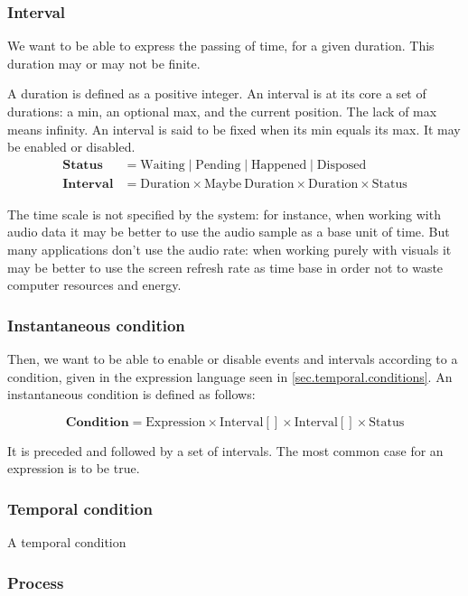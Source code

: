 \documentclass[applsci,article,submit,moreauthors,pdftex,10pt,a4paper]{mdpi}
\begin{document}
\subsubsection{Interval}
We want to be able to express the passing of time, for a given duration.
This duration may or may not be finite.

A duration is defined as a positive integer.
An interval is at its core a set of durations: a min, an optional max, and the current position. 
The lack of max means infinity.
An interval is said to be fixed when its min equals its max. It may be enabled or disabled.
\begin{align*}
\mathbf{Status} &= \mathrm{Waiting} \mid \mathrm{Pending} \mid \mathrm{Happened} \mid \mathrm{Disposed} \\
\mathbf{Interval} &= \mathrm{Duration} \times \mathrm{Maybe} ~\mathrm{Duration} \times \mathrm{Duration} \times \mathrm{Status}
\end{align*}

The time scale is not specified by the system: for instance, when working with audio data it may be better to use the audio sample as a base unit of time.
But many applications don't use the audio rate: when working purely with visuals it may be better to use the screen refresh rate as time base in order not to 
waste computer resources and energy.

\subsubsection{Instantaneous condition}
Then, we want to be able to enable or disable events and intervals according to a condition, given in the expression language seen in \ref{sec.temporal.conditions}. An instantaneous condition is defined as follows: 

\[
\mathbf{Condition} = \mathrm{Expression} \times \mathrm{Interval}[] \times \mathrm{Interval}[] \times \mathrm{Status}
\]

It is preceded and followed by a set of intervals.
The most common case for an expression is to be true.


\subsubsection{Temporal condition}
A temporal condition

\subsubsection{Process}
\end{document}
